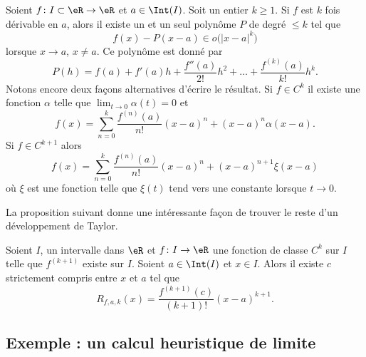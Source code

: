 \begin{proposition}		\label{PropDevTaylorPol}
    Soient $f\colon I\subset\eR\to \eR$ et $a\in\Int(I)$. Soit un entier $k\geq 1$. Si $f$ est $k$ fois dérivable en $a$, alors il existe un et un seul polynôme $P$ de degré $\leq k$ tel que
    \begin{equation}
        f(x)-P(x-a)\in o\big( | x-a |^k \big)
    \end{equation}
    lorsque $x\to a$, $x\neq a$. Ce polynôme  est donné par
    \begin{equation}
        P(h)=f(a)+f'(a)h+\frac{ f''(a) }{ 2! }h^2+\ldots+\frac{ f^{(k)}(a) }{ k! }h^k.
    \end{equation}
    Notons encore deux façons alternatives d'écrire le résultat. Si \( f\in C^k\) il existe une fonction \( \alpha\) telle que \( \lim_{t\to 0} \alpha(t)=0\) et
    \begin{equation}
        f(x)=\sum_{n=0}^k\frac{ f^{(n)}(a) }{ n! }(x-a)^n+(x-a)^n\alpha(x-a).
    \end{equation}
    Si \( f\in C^{k+1}\) alors
    \begin{equation}        \label{EquQtpoN}
        f(x)=\sum_{n=0}^k\frac{ f^{(n)}(a) }{ n! }(x-a)^n+(x-a)^{n+1}\xi(x-a)
    \end{equation}
    où \( \xi\) est une fonction telle que \( \xi(t)\) tend vers une constante lorsque \( t\to 0\).
\end{proposition}

La proposition suivant donne une intéressante façon de trouver le reste d'un développement de Taylor.
\begin{proposition}		\label{PropResteTaylorc}
Soient $I$, un intervalle dans $\eR$ et $f\colon I\to \eR$ une fonction de classe $C^k$ sur $I$ telle que $f^{(k+1)}$ existe sur $I$. Soient $a\in\Int(I)$ et $x\in I$. Alors il existe $c$ strictement compris entre $x$ et $a$ tel que 
\begin{equation}
	R_{f,a,k}(x)=\frac{ f^{(k+1)}(c) }{ (k+1)! }(x-a)^{k+1}.
\end{equation}
\end{proposition}

					\subsection{Exemple : un calcul heuristique de limite}
\label{SubSecCalcLimHeuris}

